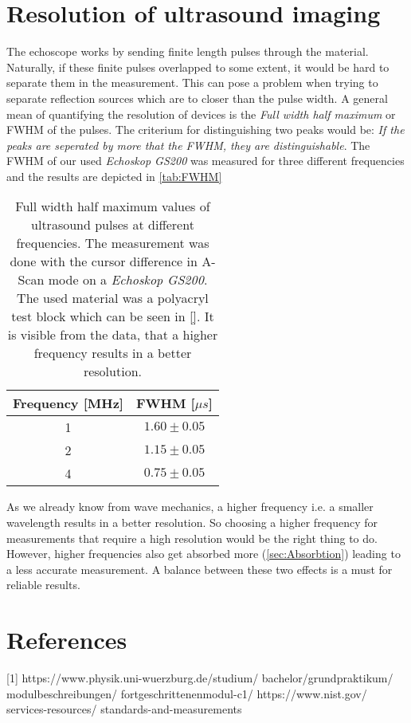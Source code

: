 \documentclass[a4paper,10pt,twocolumn]{article}
\begin{document}
    
    
    \section{Resolution of ultrasound imaging}\label{sec:Resolution}
    The echoscope works by sending finite length pulses through the material.
    Naturally, if these finite pulses overlapped to some extent, it would be hard to separate them in the measurement.
    This can pose a problem when trying to separate reflection sources which are to closer than the pulse width.
    A general mean of quantifying the resolution of devices is the \textit{Full width half maximum} or FWHM of the pulses.
    The criterium for distinguishing two peaks would be: \textit{If the peaks are seperated by more that the FWHM, they are distinguishable}.
    The FWHM of our used \textit{Echoskop GS200} was measured for three different frequencies and the results are depicted in \autoref{tab:FWHM}
    \begin{table}[htbp]
        \centering
        \begin{tabular*}{0.9\linewidth}{@{\extracolsep{\fill}}cc}
            \hline
            \hline
            \rule[-7pt]{0pt}{23pt}  Frequency [MHz]  &  FWHM [$\mu s$] 	 \\
            \hline
            \rule[-5pt]{0pt}{23pt}    1   &  $1.60 \pm 0.05 $	 \\
            \rule[-5pt]{0pt}{23pt}    2   &    $1.15 \pm 0.05$  \\
            \rule[-5pt]{0pt}{23pt}    4   &   $0.75 \pm 0.05$  \\
            \hline
            \hline
        \end{tabular*}
        \normalsize
        \caption[]{Full width half maximum values of ultrasound pulses at different frequencies.
        The measurement was done with the cursor difference in A-Scan mode on a \textit{Echoskop GS200}.
        The used material was a polyacryl test block which can be seen in \autoref{}.
        It is visible from the data, that a higher frequency results in a better resolution.}
        \label{tab:FWHM}
    \end{table}
    
    As we already know from wave mechanics, a higher frequency i.e. a smaller wavelength results in a better resolution.
    So choosing a higher frequency for measurements that require a high resolution would be the right thing to do.
    However, higher frequencies also get absorbed more (\autoref{sec:Absorbtion}) leading to a less accurate measurement.
    A balance between these two effects is a must for reliable results.
    
    \section{References}
    [1] https://www.physik.uni-wuerzburg.de/studium/ bachelor/grundpraktikum/ modulbeschreibungen/ fortgeschrittenenmodul-c1/
    \newline
    [2] https://www.nist.gov/ services-resources/ standards-and-measurements
\end{document}
